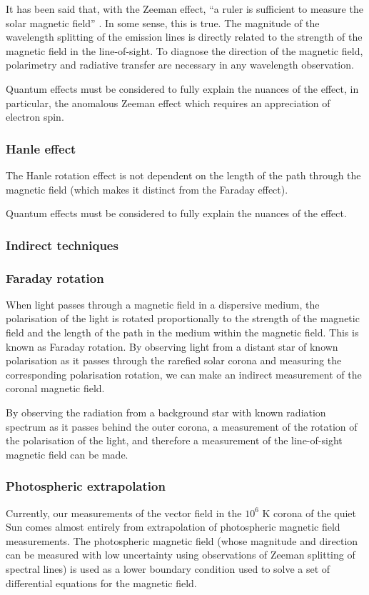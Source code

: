 \documentclass[12pt]{../style-files/ociamthesis}
\begin{document}
It has been said that, with the Zeeman effect, “a ruler is sufficient to measure the solar magnetic field” \citep{lan03}. In some sense, this is true. The magnitude of the wavelength splitting of the emission lines is directly related to the strength of the magnetic field in the line-of-sight. To diagnose the direction of the magnetic field, polarimetry and radiative transfer are necessary in any wavelength observation.

Quantum effects must be considered to fully explain the nuances of the effect, in particular, the anomalous Zeeman effect which requires an appreciation of electron spin.

\subsubsection{Hanle effect}
The Hanle rotation effect is not dependent on the length of the path through the magnetic field (which makes it distinct from the Faraday effect). 

Quantum effects must be considered to fully explain the nuances of the effect.

\subsubsection{Indirect techniques}
\subsubsection{Faraday rotation}
When light passes through a magnetic field in a dispersive medium, the polarisation of the light is rotated proportionally to the strength of the magnetic field and the length of the path in the medium within the magnetic field. This is known as Faraday rotation. By observing light from a distant star of known polarisation as it passes through the rarefied solar corona and measuring the corresponding polarisation rotation, we can make an indirect measurement of the coronal magnetic field.

By observing the radiation from a background star with known radiation spectrum as it passes behind the outer corona, a measurement of the rotation of the polarisation of the light, and therefore a measurement of the line-of-sight magnetic field can be made.


\subsubsection{Photospheric extrapolation}
Currently, our measurements of the vector field in the $10^6$ K corona of the quiet Sun comes almost entirely from extrapolation of photospheric magnetic field measurements. The photospheric magnetic field (whose magnitude and direction can be measured with low uncertainty using observations of Zeeman splitting of spectral lines) is used as a lower boundary condition used to solve a set of differential equations for the magnetic field.
\end{document}
